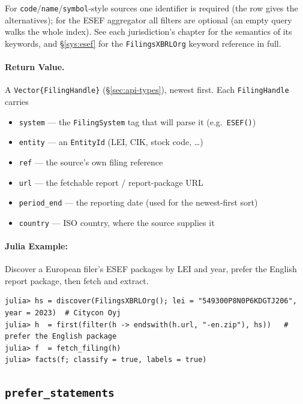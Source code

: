 \documentclass[11pt,a4paper]{report}
\begin{document}
\noindent For \texttt{code}/\texttt{name}/\texttt{symbol}-style sources one identifier is required (the row
gives the alternatives); for the ESEF aggregator all filters are optional (an empty query walks the whole
index). See each jurisdiction's chapter for the semantics of its keywords, and \S\ref{sys:esef} for the
\texttt{FilingsXBRLOrg} keyword reference in full.

\paragraph{Return Value.}
A \texttt{Vector\{FilingHandle\}} (\S\ref{sec:api-types}), newest first. Each \texttt{FilingHandle} carries
\begin{itemize}[nosep]
  \item \texttt{system} --- the \texttt{FilingSystem} tag that will parse it (e.g.\ \texttt{ESEF()})
  \item \texttt{entity} --- an \texttt{EntityId} (LEI, CIK, stock code, \dots)
  \item \texttt{ref} --- the source's own filing reference
  \item \texttt{url} --- the fetchable report / report-package URL
  \item \texttt{period\_end} --- the reporting date (used for the newest-first sort)
  \item \texttt{country} --- ISO country, where the source supplies it
\end{itemize}

\paragraph{Julia Example:} Discover a European filer's ESEF packages by LEI and year, prefer the English
report package, then fetch and extract.

\begin{lstlisting}
julia> hs = discover(FilingsXBRLOrg(); lei = "549300P8N0P6KDGTJ206", year = 2023)  # Citycon Oyj
julia> h  = first(filter(h -> endswith(h.url, "-en.zip"), hs))   # prefer the English package
julia> f  = fetch_filing(h)
julia> facts(f; classify = true, labels = true)
\end{lstlisting}

\subsection{\texttt{prefer\_statements}}
\label{sec:api-prefer-statements}
\end{document}
